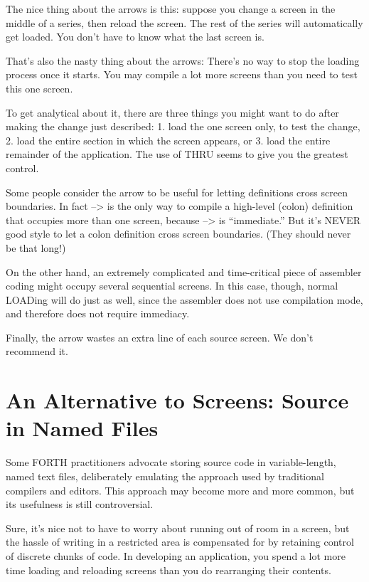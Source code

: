 The nice thing about the arrows is this: suppose you change a screen
in the middle of a series, then reload the screen.  The rest of the series will
automatically get loaded.  You don't have to know what the last screen is.

That's also the nasty thing about the arrows: There's no way to stop
the loading process once it starts.  You may compile a lot more screens
than you need to test this one screen.

To get analytical about it, there are three things you might want to
do after making the change just described:
1. load the one screen only, to test the change,
2. load the entire section in which the screen appears,
or
3. load the entire remainder of the application.
The use of THRU seems to give you the greatest control.

Some people consider the arrow to be useful for letting definitions
cross screen boundaries.  In fact --> is the only way to compile a high-level
(colon) definition that occupies more than one screen, because --> is
``immediate.'' But it's NEVER good style to let a colon definition cross
screen boundaries.  (They should never be that long!)

On the other hand, an extremely complicated and time-critical piece
of assembler coding might occupy several sequential screens.  In this
case, though, normal LOADing will do just as well, since the assembler
does not use compilation mode, and therefore does not require
immediacy.

Finally, the arrow wastes an extra line of each source screen.  We
don't recommend it.
\section{An Alternative to Screens: Source in Named Files}

Some FORTH practitioners advocate storing source code in variable-length,
named text files, deliberately emulating the approach used by
traditional compilers and editors.  This approach may become more and
more common, but its usefulness is still controversial.

Sure, it's nice not to have to worry about running out of room in a
screen, but the hassle of writing in a restricted area is compensated for by
retaining control of discrete chunks of code.  In developing an application,
you spend a lot more time loading and reloading screens than you do rearranging
their contents.

